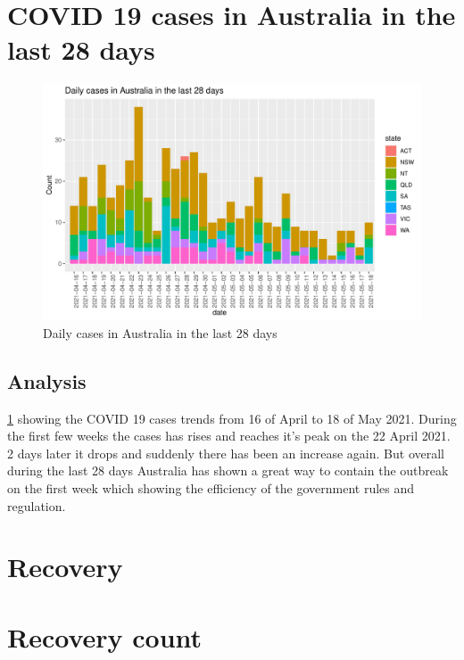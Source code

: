 \documentclass[11pt,a4paper,]{article}
\begin{document}
\hypertarget{covid-19-cases-in-australia-in-the-last-28-days}{%
\section{COVID 19 cases in Australia in the last 28 days}\label{covid-19-cases-in-australia-in-the-last-28-days}}

\begin{figure}
\centering
\includegraphics{report_files/figure-latex/figref2-1.pdf}
\caption{\label{fig:figref2}Daily cases in Australia in the last 28 days}
\end{figure}

\hypertarget{analysis-2}{%
\subsection{Analysis}\label{analysis-2}}

\ref{fig:figref2} showing the COVID 19 cases trends from 16 of April to 18 of May 2021. During the first few weeks the cases has rises and reaches it's peak on the 22 April 2021. 2 days later it drops and suddenly there has been an increase again. But overall during the last 28 days Australia has shown a great way to contain the outbreak on the first week which showing the efficiency of the government rules and regulation.

\section*{Recovery}

\hypertarget{recovery-count}{%
\section{Recovery count}\label{recovery-count}}
\end{document}
